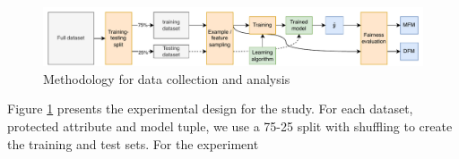 \documentclass{article}
\begin{document}






\begin{figure}
  \centering
  \includegraphics[width=0.95\linewidth]{method.pdf}
  \caption{Methodology for data collection and analysis}
  \label{fig:method}
\end{figure}

Figure \ref{fig:method} presents the experimental design for the
study. For each dataset, protected attribute and model tuple, we use a
75-25 split with shuffling to create the training and test sets. For
the experiment
\end{document}
